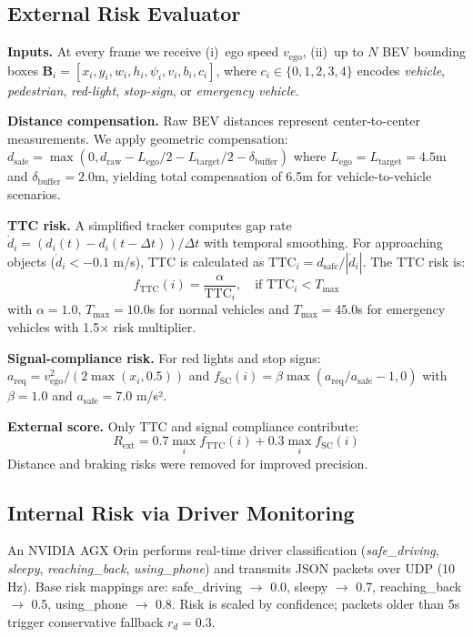 \subsection{External Risk Evaluator}
\textbf{Inputs.} At every frame we receive
(i)~ego speed $v_{\text{ego}}$,
(ii)~up to $N$ BEV bounding boxes 
$\mathbf{B}_i=[x_i,y_i,w_i,h_i,\psi_i,v_i,b_i,c_i]$,
where $c_i\!\in\!\{0,1,2,3,4\}$ encodes
\textit{vehicle}, \textit{pedestrian}, \textit{red-light},
\textit{stop-sign}, or \textit{emergency vehicle}.

\textbf{Distance compensation.} Raw BEV distances represent center-to-center 
measurements. We apply geometric compensation:
$d_{\text{safe}} = \max(0, d_{\text{raw}} - L_{\text{ego}}/2 - L_{\text{target}}/2 - \delta_{\text{buffer}})$
where $L_{\text{ego}} = L_{\text{target}} = 4.5$m and $\delta_{\text{buffer}} = 2.0$m,
yielding total compensation of 6.5m for vehicle-to-vehicle scenarios.

\textbf{TTC risk.} A simplified tracker computes gap rate 
$\dot{d}_i = (d_i(t) - d_i(t-\Delta t))/\Delta t$ with temporal smoothing.
For approaching objects ($\dot{d}_i < -0.1$ m/s), TTC is calculated as
$\text{TTC}_i = d_{\text{safe}}/|\dot{d}_i|$. The TTC risk is:
\[
f_{\text{TTC}}(i) = \frac{\alpha}{\text{TTC}_i}, \quad \text{if } \text{TTC}_i < T_{\max}
\]
with $\alpha = 1.0$, $T_{\max} = 10.0$s for normal vehicles and $T_{\max} = 45.0$s 
for emergency vehicles with 1.5× risk multiplier.

\textbf{Signal-compliance risk.} For red lights and stop signs:
$a_{\text{req}} = v_{\text{ego}}^2/(2\max(x_i, 0.5))$ and
$f_{\text{SC}}(i) = \beta \max(a_{\text{req}}/a_{\text{safe}} - 1, 0)$
with $\beta = 1.0$ and $a_{\text{safe}} = 7.0$ m/s².

\textbf{External score.} Only TTC and signal compliance contribute:
\[
R_{\text{ext}} = 0.7 \max_i f_{\text{TTC}}(i) + 0.3 \max_i f_{\text{SC}}(i)
\]
Distance and braking risks were removed for improved precision.

\subsection{Internal Risk via Driver Monitoring}
An NVIDIA AGX Orin performs real-time driver classification
(\textit{safe\_driving}, \textit{sleepy}, \textit{reaching\_back},
\textit{using\_phone}) and transmits JSON packets over UDP (10 Hz).
Base risk mappings are: safe\_driving $\rightarrow$ 0.0, sleepy $\rightarrow$ 0.7,
reaching\_back $\rightarrow$ 0.5, using\_phone $\rightarrow$ 0.8.
Risk is scaled by confidence; packets older than 5s trigger
conservative fallback $r_d = 0.3$.


